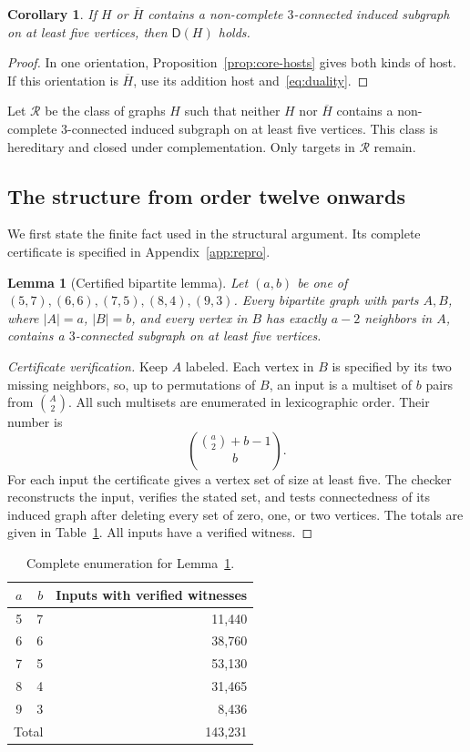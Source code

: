 \documentclass[11pt,reqno]{amsart}
\newtheorem{lemma}[theorem]{Lemma}
\newtheorem{corollary}[theorem]{Corollary}
\theoremstyle{definition}
\theoremstyle{remark}
\newcommand{\comp}[1]{\overline{#1}}
\newcommand{\Rclass}{\mathcal{R}}
\newcommand{\Dsat}{\mathsf{D}}
\begin{document}
\begin{corollary}\label{cor:outside-R}
If $H$ or $\comp H$ contains a non-complete $3$-connected induced subgraph on at least five vertices, then $\Dsat(H)$ holds.
\end{corollary}
\begin{proof}
In one orientation, Proposition~\ref{prop:core-hosts} gives both kinds of host. If this orientation is $\comp H$, use its addition host and~\eqref{eq:duality}.
\end{proof}

Let $\Rclass$ be the class of graphs $H$ such that neither $H$ nor $\comp H$ contains a non-complete $3$-connected induced subgraph on at least five vertices. This class is hereditary and closed under complementation. Only targets in $\Rclass$ remain.

\subsection{The structure from order twelve onwards}

We first state the finite fact used in the structural argument. Its complete certificate is specified in Appendix~\ref{app:repro}.

\begin{lemma}[Certified bipartite lemma]\label{lem:bipartite}
Let $(a,b)$ be one of $(5,7),(6,6),(7,5),(8,4),(9,3)$. Every bipartite graph with parts $A,B$, where $|A|=a$, $|B|=b$, and every vertex in $B$ has exactly $a-2$ neighbors in $A$, contains a $3$-connected subgraph on at least five vertices.
\end{lemma}
\begin{proof}[Certificate verification]
Keep $A$ labeled. Each vertex in $B$ is specified by its two missing neighbors, so, up to permutations of $B$, an input is a multiset of $b$ pairs from $\binom A2$. All such multisets are enumerated in lexicographic order. Their number is
\[
 \binom{\binom a2+b-1}{b}.
\]
For each input the certificate gives a vertex set of size at least five. The checker reconstructs the input, verifies the stated set, and tests connectedness of its induced graph after deleting every set of zero, one, or two vertices. The totals are given in Table~\ref{tab:bipartite}. All inputs have a verified witness.
\end{proof}

\begin{table}[htbp]
\centering
\caption{Complete enumeration for Lemma~\ref{lem:bipartite}.}\label{tab:bipartite}
\begin{tabular}{rrr}\toprule
$a$ & $b$ & Inputs with verified witnesses\\\midrule
5&7&11,440\\
6&6&38,760\\
7&5&53,130\\
8&4&31,465\\
9&3&8,436\\\midrule
\multicolumn{2}{l}{Total}&143,231\\\bottomrule
\end{tabular}
\end{table}
\end{document}
